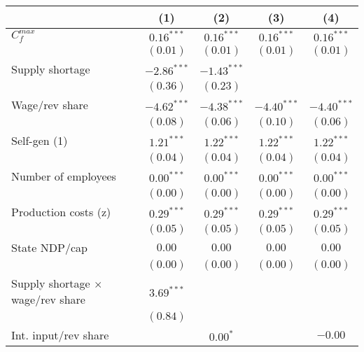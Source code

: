 
\begin{tabular}{l c c c c }
\toprule
 & (1) & (2) & (3) & (4) \\
\midrule
$C^{max}_{f}$                             & $0.16^{***}$  & $0.16^{***}$  & $0.16^{***}$  & $0.16^{***}$  \\
                                          & $(0.01)$      & $(0.01)$      & $(0.01)$      & $(0.01)$      \\
Supply shortage                           & $-2.86^{***}$ & $-1.43^{***}$ &               &               \\
                                          & $(0.36)$      & $(0.23)$      &               &               \\
Wage/rev share                            & $-4.62^{***}$ & $-4.38^{***}$ & $-4.40^{***}$ & $-4.40^{***}$ \\
                                          & $(0.08)$      & $(0.06)$      & $(0.10)$      & $(0.06)$      \\
Self-gen (1)                              & $1.21^{***}$  & $1.22^{***}$  & $1.22^{***}$  & $1.22^{***}$  \\
                                          & $(0.04)$      & $(0.04)$      & $(0.04)$      & $(0.04)$      \\
Number of employees                       & $0.00^{***}$  & $0.00^{***}$  & $0.00^{***}$  & $0.00^{***}$  \\
                                          & $(0.00)$      & $(0.00)$      & $(0.00)$      & $(0.00)$      \\
Production costs (z)                      & $0.29^{***}$  & $0.29^{***}$  & $0.29^{***}$  & $0.29^{***}$  \\
                                          & $(0.05)$      & $(0.05)$      & $(0.05)$      & $(0.05)$      \\
State NDP/cap                             & $0.00$        & $0.00$        & $0.00$        & $0.00$        \\
                                          & $(0.00)$      & $(0.00)$      & $(0.00)$      & $(0.00)$      \\
Supply shortage $\times$ wage/rev share   & $3.69^{***}$  &               &               &               \\
                                          & $(0.84)$      &               &               &               \\
Int. input/rev share                      &               & $0.00^{*}$    &               & $-0.00$       \\

\end{tabular}

